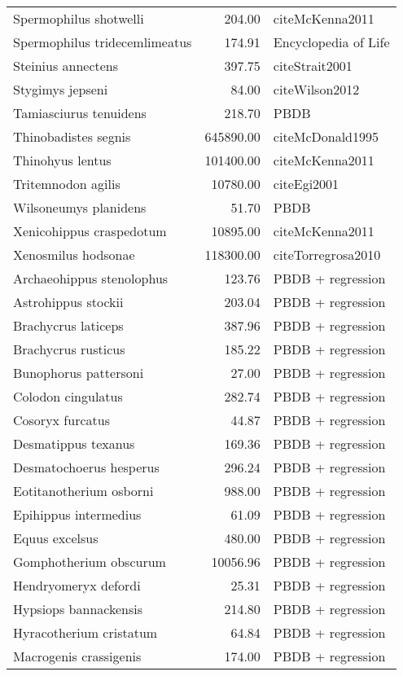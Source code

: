 \begin{table}[ht]
\begin{tabular}{lrl}
  Spermophilus shotwelli & 204.00 & cite{McKenna2011} \\ 
  Spermophilus tridecemlimeatus & 174.91 & Encyclopedia of Life \\ 
  Steinius annectens & 397.75 & cite{Strait2001} \\ 
  Stygimys jepseni & 84.00 & cite{Wilson2012} \\ 
  Tamiasciurus tenuidens & 218.70 & PBDB \\ 
  Thinobadistes segnis & 645890.00 & cite{McDonald1995} \\ 
  Thinohyus lentus & 101400.00 & cite{McKenna2011} \\ 
  Tritemnodon agilis & 10780.00 & cite{Egi2001} \\ 
  Wilsoneumys planidens & 51.70 & PBDB \\ 
  Xenicohippus craspedotum & 10895.00 & cite{McKenna2011} \\ 
  Xenosmilus hodsonae & 118300.00 & cite{Torregrosa2010} \\ 
  Archaeohippus stenolophus & 123.76 & PBDB + regression \\ 
  Astrohippus stockii & 203.04 & PBDB + regression \\ 
  Brachycrus laticeps & 387.96 & PBDB + regression \\ 
  Brachycrus rusticus & 185.22 & PBDB + regression \\ 
  Bunophorus pattersoni & 27.00 & PBDB + regression \\ 
  Colodon cingulatus & 282.74 & PBDB + regression \\ 
  Cosoryx furcatus & 44.87 & PBDB + regression \\ 
  Desmatippus texanus & 169.36 & PBDB + regression \\ 
  Desmatochoerus hesperus & 296.24 & PBDB + regression \\ 
  Eotitanotherium osborni & 988.00 & PBDB + regression \\ 
  Epihippus intermedius & 61.09 & PBDB + regression \\ 
  Equus excelsus & 480.00 & PBDB + regression \\ 
  Gomphotherium obscurum & 10056.96 & PBDB + regression \\ 
  Hendryomeryx defordi & 25.31 & PBDB + regression \\ 
  Hypsiops bannackensis & 214.80 & PBDB + regression \\ 
  Hyracotherium cristatum & 64.84 & PBDB + regression \\ 
  Macrogenis crassigenis & 174.00 & PBDB + regression \\ 

\end{tabular}
\end{table}
